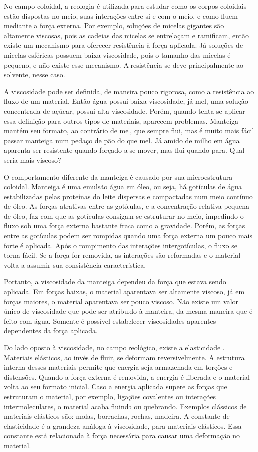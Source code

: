 		No campo coloidal, a reologia é utilizada para estudar como os corpos coloidais estão dispostas no meio, suas interações entre si e com o meio, e como fluem mediante a força externa. Por exemplo, soluções de micelas gigantes são altamente viscosas, pois as cadeias das micelas se entrelaçam e ramificam, então existe um mecanismo para oferecer resistência à força aplicada. Já soluções de micelas esféricas possuem baixa viscosidade, pois o tamanho das micelas é pequeno, e não existe esse mecanismo. A resistência se deve principalmente ao solvente, nesse caso.
		
		A viscosidade pode ser definida, de maneira pouco rigorosa, como a resistência ao fluxo de um material.  Então água possui baixa viscosidade, já mel, uma solução concentrada de açúcar, possui alta viscosidade. Porém, quando tenta-se aplicar essa definição para outros tipos de materiais, aparecem problemas. Manteiga mantém seu formato, ao contrário de mel, que sempre flui, mas é muito mais fácil passar manteiga num pedaço de pão do que mel. Já amido de milho em água aparenta ser resistente quando forçado a se mover, mas flui quando para. Qual seria mais viscoso? 
		
		O comportamento diferente da manteiga é causado por sua microestrutura coloidal. Manteiga é uma emulsão água em óleo, ou seja, há gotículas de água estabilizadas pelas proteínas do leite dispersas e compactadas num meio contínuo de óleo. As forças atrativas entre as gotículas, e a concentração relativa pequena de óleo, faz com que as gotículas consigam se estruturar no meio, impedindo o fluxo sob uma força externa bastante fraca como a gravidade. Porém, as forças entre as gotículas podem ser rompidas quando uma força externa um pouco mais forte é aplicada. Após o rompimento das interações intergotículas, o fluxo se torna fácil. Se a força for removida, as interações são reformadas e o material volta a assumir sua consistência característica.
		
		Portanto, a viscosidade da manteiga dependeu da força que estava sendo aplicada. Em forças baixas, o material aparentava ser altamente viscoso, já em forças maiores, o material aparentava ser pouco viscoso. Não existe um valor único de viscosidade que pode ser atribuído à manteira, da mesma maneira que é feito com água. Somente é possível estabelecer viscosidades aparentes dependentes da força aplicada.
		
		Do lado oposto à viscosidade, no campo reológico, existe a elasticidade . Materiais elásticos, ao invés de fluir, se deformam reversivelmente. A estrutura interna desses materiais permite que energia seja armazenada em torções e distensões. Quando a força externa é removida, a energia é liberada e o material volta ao seu formato inicial. Caso a energia aplicada supere as forças que estruturam o material, por exemplo, ligações covalentes ou interações intermoleculares, o material acaba fluindo ou quebrando. Exemplos clássicos de materiais elásticos são: molas, borrachas, rochas, madeira. A constante de elasticidade é a grandeza análoga à viscosidade, para materiais elásticos. Essa constante está relacionada à força necessária para causar uma deformação no material. 

